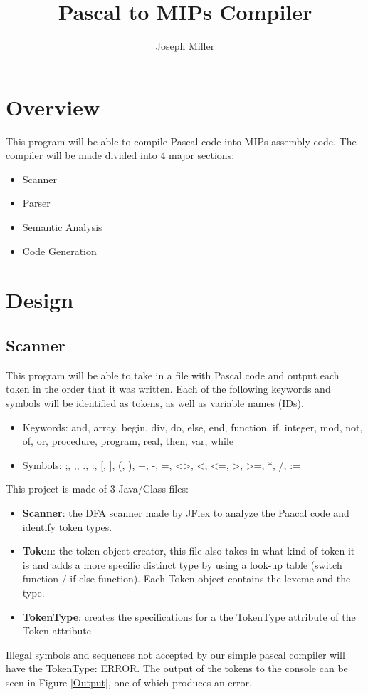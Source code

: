 \documentclass[english]{article}
\begin{document}
\title{Pascal to MIPs Compiler}
\author{Joseph Miller}
\maketitle



\section{Overview}

This program will be able to compile Pascal code into MIPs assembly code.  The compiler will be made divided into 4 major sections:

\begin{itemize}
\item
Scanner
\item
Parser
\item
Semantic Analysis
\item
Code Generation
\end{itemize}

\section{Design}

\subsection{Scanner}

This program will be able to take in a file with Pascal code and output each token in the order that it was written. Each of the following keywords and symbols will be identified as tokens, as well as variable names (IDs).

\renewcommand{\labelitemi}{$\textendash$}
\begin{itemize}
\item
Keywords: and, array, begin, div, do, else, end, function, if, integer, mod, not, of, or, procedure, program, real, then, var, while
\item
Symbols: ;, ,, ., :, [, ], (, ), +, -, =, \textless\textgreater, \textless, \textless=, \textgreater, \textgreater=, *, /, :=
\end{itemize}
This project is made of 3 Java/Class files:
\begin{itemize}

\item
\textbf{Scanner}: the DFA scanner made by JFlex to analyze the Paacal code and identify token types.
\item
\textbf{Token}: the token object creator, this file also takes in what kind of token it is and adds a more specific distinct type by using a look-up table (switch function / if-else function). Each Token object contains the lexeme and the type.
\item
\textbf{TokenType}: creates the specifications for a the TokenType attribute of the Token attribute
\end{itemize}
Illegal symbols and sequences not accepted by our simple pascal compiler will have the TokenType: ERROR. The output of the tokens to the console can be seen in Figure \ref{Output}, one of which produces an error.
\end{document}

